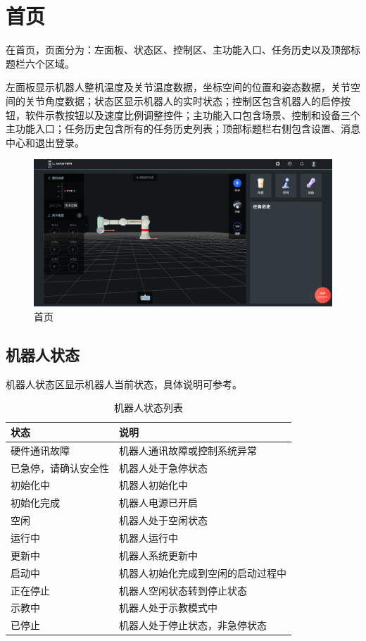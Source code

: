 \clearpage

\section{首页}

在\LM 首页，页面分为：左面板、状态区、控制区、主功能入口、任务历史以及顶部标题栏六个区域。

左面板显示机器人整机温度及关节温度数据，坐标空间的位置和姿态数据，关节空间的关节角度数据；状态区显示机器人的实时状态；控制区包含机器人的启停按钮，软件示教按钮以及速度比例调整控件；主功能入口包含场景、控制和设备三个主功能入口；任务历史包含所有的任务历史列表；顶部标题栏右侧包含设置、消息中心和退出登录。

\begin{figure}[ht]
	\centering
	\includegraphics[width=\textwidth]{screen/2-10.png}
	\caption{\LM 首页}
	\label{fig:LM首页}
\end{figure}

\clearpage

\subsection{机器人状态}

机器人状态区显示机器人当前状态，具体说明可参考。

\begin{table}[ht]
    \centering\small
    \begin{tabular}{|l|l|}\hline
\sf 状态 & \sf 说明\\\hline
硬件通讯故障 & 机器人通讯故障或控制系统异常\\\hline
已急停，请确认安全性 & 机器人处于急停状态\\\hline
初始化中 & 机器人初始化中\\\hline
初始化完成 & 机器人电源已开启\\\hline
空闲 & 机器人处于空闲状态\\\hline
运行中 & 机器人运行中\\\hline
更新中 & 机器人系统更新中\\\hline
启动中 & 机器人初始化完成到空闲的启动过程中\\\hline
正在停止 & 机器人空闲状态转到停止状态\\\hline
示教中 & 机器人处于示教模式中\\\hline
已停止 & 机器人处于停止状态，非急停状态\\\hline
    \end{tabular}
    \caption{机器人状态列表}
    \label{tab:机器人状态列表}
\end{table}

